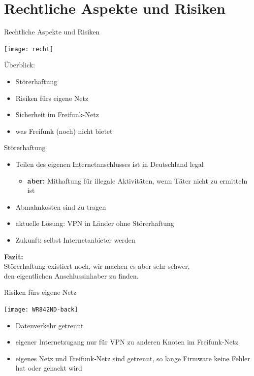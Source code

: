 \documentclass{beamer}
\begin{document}
\section{Rechtliche Aspekte und Risiken}
\begin{frame}{Rechtliche Aspekte und Risiken}
\begin{Row}
\begin{Cell}{1}
\vspace{0.1cm}
\texttt{[image: recht]}
\end{Cell}
\begin{Cell}{2}
\vspace{1cm}
Überblick:
\begin{itemize}
\pause \item Störerhaftung
\pause \item Risiken fürs eigene Netz
\pause \item Sicherheit im Freifunk-Netz
\pause \item was Freifunk (noch) nicht bietet
\end{itemize}
\end{Cell}
\end{Row}
\end{frame}

\begin{frame}{Störerhaftung}
\begin{itemize}
\pause\item Teilen des eigenen Internetanschlusses ist in Deutschland legal
\begin{itemize}
	\pause\item \textbf{aber:} Mithaftung für illegale Aktivitäten, wenn Täter nicht zu ermitteln ist
\end{itemize}
\pause\item Abmahnkosten sind zu tragen
\vfill
\pause\item aktuelle Lösung: VPN in Länder ohne Störerhaftung
\pause\item Zukunft: selbst Internetanbieter werden
\end{itemize}
\vfill
\centering
\pause \textbf{Fazit:}\\Störerhaftung existiert noch, wir machen es aber sehr schwer,\\den eigentlichen Anschlussinhaber zu finden.

\end{frame}

\begin{frame}{Risiken fürs eigene Netz}
\vfill
\begin{center}
\texttt{[image: WR842ND-back]}
\end{center}
\begin{itemize}
\pause\item Datenverkehr getrennt
\pause\item eigener Internetzugang nur für VPN zu anderen Knoten im Freifunk-Netz
\pause\item eigenes Netz und Freifunk-Netz sind getrennt, so lange Firmware keine Fehler hat oder gehackt wird
\end{itemize}
\vfill
\end{frame}
\end{document}
